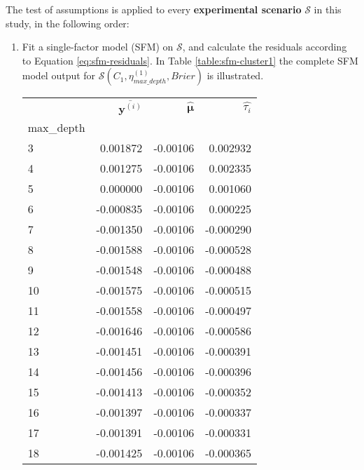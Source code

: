 The test of assumptions is applied to every \textbf{experimental scenario} $\mathcal{S}$ in this study, in the following order:
\newpage
\begin{enumerate}
    \item Fit a single-factor model (SFM) on $\mathcal{S}$, and calculate the residuals according to Equation \ref{eq:sfm-residuals}. In Table \ref{table:sfm-cluster1} the complete SFM model output for $\mathcal{S}(C_1, \eta^{(1)}_{max\_depth}, Brier)$ is illustrated.
    \begin{table}[!h]
        \centering
        \begin{tabular}{lrrr}
            \toprule
            {} &  $\overline{\bm{y}^{(i)}}$ &  $ \hat{\bm{\mu}}$ & $ \hat{\tau_i}$  \\
            max\_depth &                 &          &             \\
            \midrule
            3         &        0.001872 & -0.00106 &    0.002932 \\
            4         &        0.001275 & -0.00106 &    0.002335 \\
            5         &        0.000000 & -0.00106 &    0.001060 \\
            6         &       -0.000835 & -0.00106 &    0.000225 \\
            7         &       -0.001350 & -0.00106 &   -0.000290 \\
            8         &       -0.001588 & -0.00106 &   -0.000528 \\
            9         &       -0.001548 & -0.00106 &   -0.000488 \\
            10        &       -0.001575 & -0.00106 &   -0.000515 \\
            11        &       -0.001558 & -0.00106 &   -0.000497 \\
            12        &       -0.001646 & -0.00106 &   -0.000586 \\
            13        &       -0.001451 & -0.00106 &   -0.000391 \\
            14        &       -0.001456 & -0.00106 &   -0.000396 \\
            15        &       -0.001413 & -0.00106 &   -0.000352 \\
            16        &       -0.001397 & -0.00106 &   -0.000337 \\
            17        &       -0.001391 & -0.00106 &   -0.000331 \\
            18        &       -0.001425 & -0.00106 &   -0.000365 \\

\end{tabular}
\end{table}
\end{enumerate}
